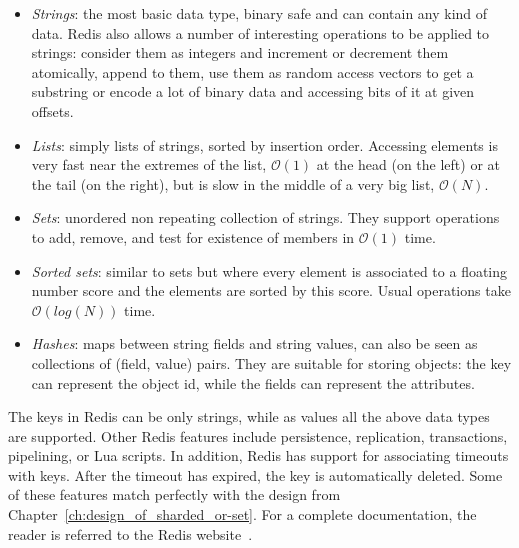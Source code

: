 \begin{itemize}
  \item \textit{Strings}: the most basic data type, binary safe and can contain
  any kind of data. Redis also allows a number of interesting operations to be
  applied to strings: consider them as integers and increment or decrement them
  atomically, append to them, use them as random access vectors to get a
  substring or encode a lot of binary data and accessing bits of it at given
  offsets.
  \item \textit{Lists}: simply lists of strings, sorted by insertion order.
  Accessing elements is very fast near the extremes of the list,
  $\mathcal{O}(1)$ at the head (on the left) or at the tail (on the right), but
  is slow in the middle of a very big list, $\mathcal{O}(N)$.
  \item \textit{Sets}: unordered non repeating collection of strings. They
  support operations to add, remove, and test for existence of members in
  $\mathcal{O}(1)$ time.
  \item \textit{Sorted sets}: similar to sets but where every element is
  associated to a floating number score and the elements are sorted by this
  score. Usual operations take $\mathcal{O}(log(N))$ time.
  \item \textit{Hashes}: maps between string fields and string values, can
  also be seen as collections of (field, value) pairs. They are suitable for
  storing objects: the key can represent the object id, while the fields can
  represent the attributes.
\end{itemize}

The keys in Redis can be only strings, while as values all the above data
types are supported. Other Redis features include persistence, replication,
transactions, pipelining, or Lua scripts. In addition, Redis has support for
associating timeouts with keys. After the timeout has expired, the key is
automatically deleted. Some of these features match perfectly with the design
from Chapter~\ref{ch:design_of_sharded_or-set}. For a complete documentation,
the reader is referred to the Redis website~\cite{redis}.
